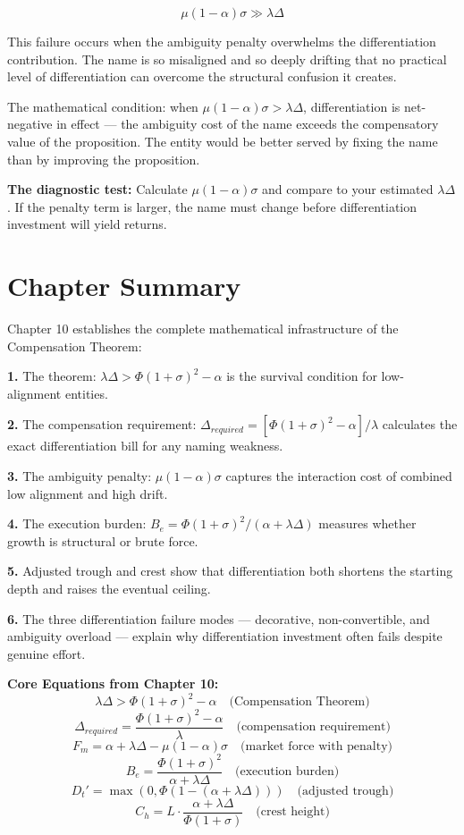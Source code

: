 \documentclass[12pt, openany]{book}
\theoremstyle{thmstyle}
\theoremstyle{defstyle}
\begin{document}
\[
\mu(1-\alpha)\sigma \gg \lambda\Delta
\]

This failure occurs when the ambiguity penalty overwhelms the differentiation contribution. The name is so misaligned and so deeply drifting that no practical level of differentiation can overcome the structural confusion it creates.

The mathematical condition: when $\mu(1-\alpha)\sigma > \lambda\Delta$, differentiation is net-negative in effect --- the ambiguity cost of the name exceeds the compensatory value of the proposition. The entity would be better served by fixing the name than by improving the proposition.

\textbf{The diagnostic test:} Calculate $\mu(1-\alpha)\sigma$ and compare to your estimated $\lambda\Delta$. If the penalty term is larger, the name must change before differentiation investment will yield returns.

\section{Chapter Summary}

Chapter 10 establishes the complete mathematical infrastructure of the Compensation Theorem:

\textbf{1.} The theorem: $\lambda\Delta > \Phi(1+\sigma)^2 - \alpha$ is the survival condition for low-alignment entities.

\textbf{2.} The compensation requirement: $\Delta_{required} = [\Phi(1+\sigma)^2 - \alpha]/\lambda$ calculates the exact differentiation bill for any naming weakness.

\textbf{3.} The ambiguity penalty: $\mu(1-\alpha)\sigma$ captures the interaction cost of combined low alignment and high drift.

\textbf{4.} The execution burden: $B_e = \Phi(1+\sigma)^2/(\alpha + \lambda\Delta)$ measures whether growth is structural or brute force.

\textbf{5.} Adjusted trough and crest show that differentiation both shortens the starting depth and raises the eventual ceiling.

\textbf{6.} The three differentiation failure modes --- decorative, non-convertible, and ambiguity overload --- explain why differentiation investment often fails despite genuine effort.

\begin{equationbox}
\textbf{Core Equations from Chapter 10:}
\[
\lambda\Delta > \Phi(1+\sigma)^2 - \alpha \quad \text{(Compensation Theorem)}
\]
\[
\Delta_{required} = \frac{\Phi(1+\sigma)^2 - \alpha}{\lambda} \quad \text{(compensation requirement)}
\]
\[
F_m = \alpha + \lambda\Delta - \mu(1-\alpha)\sigma \quad \text{(market force with penalty)}
\]
\[
B_e = \frac{\Phi(1+\sigma)^2}{\alpha + \lambda\Delta} \quad \text{(execution burden)}
\]
\[
D_t' = \max\!\left(0, \Phi(1 - (\alpha + \lambda\Delta))\right) \quad \text{(adjusted trough)}
\]
\[
C_h = L \cdot \frac{\alpha + \lambda\Delta}{\Phi(1+\sigma)} \quad \text{(crest height)}
\]
\end{equationbox}
\end{document}
